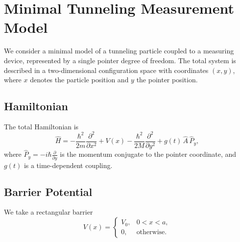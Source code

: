 
\section{Minimal Tunneling Measurement Model}

We consider a minimal model of a tunneling particle coupled to a measuring device, represented by a single pointer degree of freedom. The total system is described in a two-dimensional configuration space with coordinates $(x,y)$, where $x$ denotes the particle position and $y$ the pointer position.

\subsection{Hamiltonian}

The total Hamiltonian is
\begin{equation}
\hat H =
-\frac{\hbar^2}{2m}\frac{\partial^2}{\partial x^2}
+ V(x)
-\frac{\hbar^2}{2M}\frac{\partial^2}{\partial y^2}
+ g(t)\,\hat A\,\hat P_y,
\end{equation}
where $\hat P_y = -i\hbar \frac{\partial}{\partial y}$ is the momentum conjugate to the pointer coordinate, and $g(t)$ is a time-dependent coupling.

\subsection{Barrier Potential}

We take a rectangular barrier
\begin{equation}
V(x) =
\begin{cases}
V_0, & 0 < x < a, \\
0, & \text{otherwise}.
\end{cases}
\end{equation}

